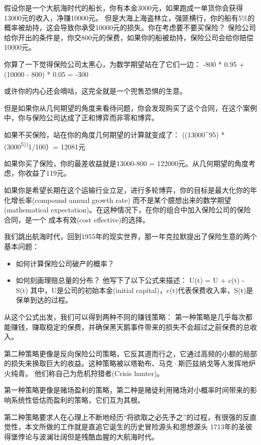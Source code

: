 \documentclass[
  oneside]{book}
\providecommand{\tightlist}{%
  \setlength{\itemsep}{0pt}\setlength{\parskip}{0pt}}
\begin{document}
假设你是一个大航海时代的船长，你有本金3000元，如果跑成一单货你会获得13000元的收入，净赚10000元。
但是大海上海盗林立，强匪横行，你的船有5\%的概率被劫持，这会导致你承受10000元的损失。你在考虑要不要买保险？
保险公司给你开出的条件是，你交800元的保费，如果你的船被劫持，保险公司会给你赔偿10000元。

你算了一下觉得保险公司太黑心，为数学期望站在了它们一边：
-800 * 0.95 + (10000 - 800) * 0.05 = -300

或许你的内心还会嘀咕，这完全就是一个兜售恐惧的生意。

但是如果你从几何期望的角度来看待问题，你会发现购买了这个合同，在这个案例中，你与保险公司达成了正和博弈而非零和博弈。

如果不买保险，站在你的角度几何期望的计算就变成了：
((13000\^{}95) * (3000\textsuperscript{5))}1/100）= 12081元

如果你买了保险，你的最差收益就是13000-800 = 122000元。从几何期望的角度考虑，你收益了119元。

如果你是希望长期在这个运输行业立足，进行多轮博弈，你的目标是最大化你的年化增长率(compound annual growth rate)
而不是某个臆想出来的数学期望(mathematical expectation)。在这种情况下，在你的组合中加入保险公司的保险合同，是一个
成本有效(cost effective)的选择。

我们跳出航海时代，回到1955年的现实世界，那一年克拉默提出了保险生意的两个基本问题：

\begin{itemize}
\tightlist
\item
  如何计算保险公司破产的概率？
\item
  如何刻画理赔总量的分布？
  他写下了以下公式来描述：
  U(t) = U + c(t) - S(t)
  其中，U是公司的初始本金(initial capital)，c(t)代表保费收入率，S(t)是保单到达的过程。
\end{itemize}

从这个公式出发，我们可以得到两种不同的赚钱策略：
第一种策略是几乎每次都能赚钱，赚取稳定的保费，并确保黑天鹅事件带来的损失不会超过之前保费的总收入。

第二种策略更像是反向保险公司策略，它反其道而行之，它通过高频的小额的局部的损失来换取巨大的收益。这种策略被以塔勒布、马克·斯匹兹纳戈等人发挥地炉火纯青。
他们称自己为危机狩猎者(Crisis hunter)。

第一种策略更像是赌场盈利的策略，第二种是赌徒利用赌场对小概率时间带来的影响系统性低估而盈利的策略，它们互为其根。

第二种策略要求人在心理上不断地经历``将欲取之必先予之''的过程，有很强的反直觉性，本文所做的工作就是直追它诞生的历史冒险源头和思想源头
1713年的圣彼得堡悖论与波澜壮阔但是残酷血腥的大航海时代。
\end{document}
